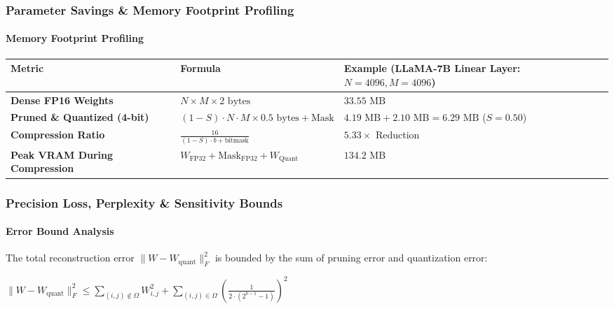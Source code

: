 \subsubsection*{Parameter Savings \& Memory Footprint Profiling}

\paragraph{Memory Footprint Profiling}

\begin{center}
\begin{adjustbox}{max width=\columnwidth}
\renewcommand{\arraystretch}{1.2}
\begin{tabular}{lll}
\toprule
Metric & Formula & Example (LLaMA-7B Linear Layer: $N=4096, M=4096$) \\
\midrule
\textbf{Dense FP16 Weights} & $N \times M \times 2 \text{ bytes}$ & $33.55 \text{ MB}$ \\
\textbf{Pruned \& Quantized (4-bit)} & $(1 - S) \cdot N \cdot M \times 0.5 \text{ bytes} + \text{Mask}$ & $4.19 \text{ MB} + 2.10 \text{ MB} = 6.29 \text{ MB}$ ($S=0.50$) \\
\textbf{Compression Ratio} & $\frac{16}{(1 - S) \cdot b + \text{bitmask}}$ & $\mathbf{5.33\times}$ Reduction \\
\textbf{Peak VRAM During Compression} & $W_{\text{FP32}} + \text{Mask}_{\text{FP32}} + W_{\text{Quant}}$ & $134.2 \text{ MB}$ \\

\bottomrule
\end{tabular}
\end{adjustbox}
\end{center}

\subsubsection*{Precision Loss, Perplexity \& Sensitivity Bounds}

\paragraph{Error Bound Analysis}

The total reconstruction error $\| W - W_{\text{quant}} \|_F^2$ is bounded by the sum of pruning error and quantization error:

\begin{center}
\begin{adjustbox}{max width=\columnwidth}
$\displaystyle
\| W - W_{\text{quant}} \|_F^2 \le \sum_{(i,j) \notin \Omega} W_{i,j}^2 + \sum_{(i,j) \in \Omega} \left( \frac{1}{2 \cdot (2^{b-1} - 1)} \right)^2
$
\end{adjustbox}
\end{center}


